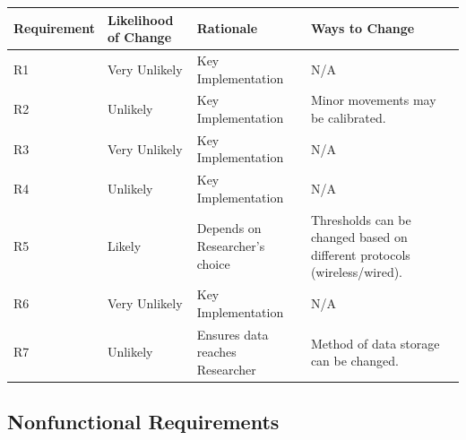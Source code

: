 \documentclass[12pt]{article}
\begin{document}
\begin{tabularx}{1.05\textwidth} { 
  | >{\raggedright\arraybackslash}X 
  | >{\centering\arraybackslash}X 
  | >{\centering\arraybackslash}X 
  | >{\raggedleft\arraybackslash}X | }
 \hline
 Requirement & Likelihood of Change& Rationale & Ways to Change \\
 \hline
 R1  & Very Unlikely  & Key Implementation & N/A  \\
 \hline
 R2  & Unlikely  & Key Implementation & Minor movements may be calibrated.  \\
 \hline
 R3  & Very Unlikely  & Key Implementation & N/A  \\
 \hline
 R4  & Unlikely  & Key Implementation & N/A  \\
\hline
 R5  & Likely  & Depends on Researcher's choice &  Thresholds can be changed based on different protocols (wireless/wired). \\
 \hline
 R6  & Very Unlikely  & Key Implementation & N/A  \\
\hline
 R7  & Unlikely  & Ensures data reaches Researcher & Method of data storage can be changed.  \\
\hline
\end{tabularx}


\subsection{Nonfunctional Requirements}
\end{document}
